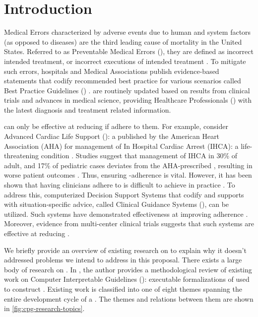 \section{Introduction}
Medical Errors characterized by adverse events due to human and system factors
(as opposed to diseases) are the third leading cause of mortality in the United
States. Referred to as Preventable Medical Errors (\PME{}), they are defined as
incorrect intended treatment, or incorrect executions of intended treatment
\cite{DonaldsonBook00}.
To mitigate such errors, hospitals and Medical Associations publish
evidence-based statements that codify recommended best practice for
various scenarios called Best Practice Guidelines (\BPGs{}) \cite{field1990clinical}.
\BPGs{} are routinely updated based on results from clinical trials and advances in medical science,
providing Healthcare Professionals (\HCPs{}) with the latest diagnosis and treatment related information.

\BPGs{} can only be effective at reducing \PMEs{} if \HCPs{} adhere to them.
For example, consider Advanced Cardiac Life Support (\ACLS{}): a \BPG{} published
by the American Heart Association (AHA) for management
of In Hospital Cardiac Arrest (IHCA): a life-threatening condition \cite{AHAGuidelineAdult, AHAGuidelinePed}.
Studies suggest that management
of IHCA in 30\% of adult, and 17\% of pediatric cases deviates from the
AHA-prescribed \BPG, resulting in worse patient outcomes \cite{Ornato2012DeviationAdult,Wolfe2020DeviationPediatric,
Crowley2020DeviationAdult,Honarmand2018Adherence,Mcevoy2014Adherence}.
Thus, ensuring \BPG{}-adherence is vital. However, it has been shown that
having clinicians adhere to \BPGs{} is difficult to achieve in practice
\cite{RandJAMA99,DavisCMAJ97}. To address this, computerized Decision Support Systems that codify \BPGs{} and supports \HCPs{} with
situation-specific advice, called Clinical Guidance Systems (\CGSs{}), can be utilized.
Such systems have demonstrated effectiveness at improving \BPG{} adherence
\cite{KwokEMA09}. Moreover, evidence from multi-center clinical trials
suggests that such systems are effective at reducing \PMEs{} \cite{BenettJAMIA16,SahotaJIS11}.

We briefly provide an overview of existing research on \CGSs{} to explain why
it doesn't addressed problems we intend to address in this proposal.
There exists a large body of research on \CGSs{}. In
\cite{PelegJBI13}, the author provides a methodological review of
existing work on Computer Interpretable Guidelines (\CIGs{}): executable
formalizations of \BPGs{} used to construct \CGSs{}.
Existing work is classified into one of eight themes spanning
the entire development cycle of a \CIG{}. The themes and relations between them
are shown in \figurename{} \ref{fig:cpg-research-topics}.

